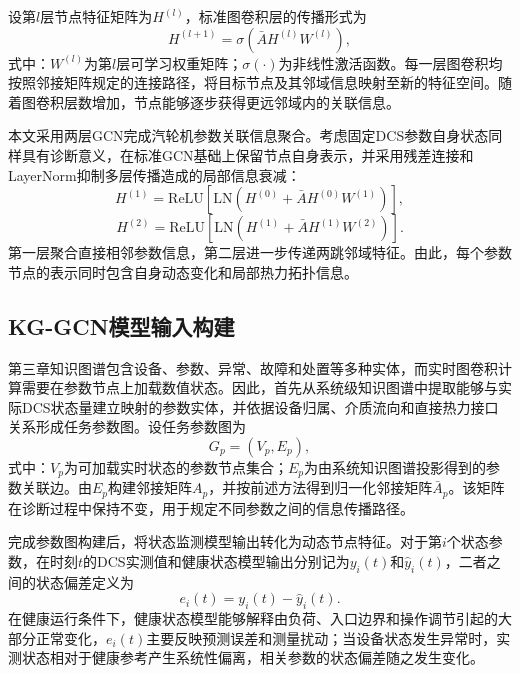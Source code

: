 设第$l$层节点特征矩阵为$H^{(l)}$，标准图卷积层的传播形式为
\begin{equation}
H^{(l+1)}=\sigma\left(\bar A H^{(l)}W^{(l)}\right),
\end{equation}
式中：$W^{(l)}$为第$l$层可学习权重矩阵；$\sigma(\cdot)$为非线性激活函数。每一层图卷积均按照邻接矩阵规定的连接路径，将目标节点及其邻域信息映射至新的特征空间。随着图卷积层数增加，节点能够逐步获得更远邻域内的关联信息。

本文采用两层GCN完成汽轮机参数关联信息聚合。考虑固定DCS参数自身状态同样具有诊断意义，在标准GCN基础上保留节点自身表示，并采用残差连接和LayerNorm抑制多层传播造成的局部信息衰减：
\begin{equation}
H^{(1)}=\mathrm{ReLU}\left[\mathrm{LN}\left(H^{(0)}+\bar A H^{(0)}W^{(1)}\right)\right],
\end{equation}
\begin{equation}
H^{(2)}=\mathrm{ReLU}\left[\mathrm{LN}\left(H^{(1)}+\bar A H^{(1)}W^{(2)}\right)\right].
\end{equation}
第一层聚合直接相邻参数信息，第二层进一步传递两跳邻域特征。由此，每个参数节点的表示同时包含自身动态变化和局部热力拓扑信息。

\subsection{KG-GCN模型输入构建}
\label{subsec:kg_input_v7}

第三章知识图谱包含设备、参数、异常、故障和处置等多种实体，而实时图卷积计算需要在参数节点上加载数值状态。因此，首先从系统级知识图谱中提取能够与实际DCS状态量建立映射的参数实体，并依据设备归属、介质流向和直接热力接口关系形成任务参数图。设任务参数图为
\begin{equation}
G_p=(V_p,E_p),
\end{equation}
式中：$V_p$为可加载实时状态的参数节点集合；$E_p$为由系统知识图谱投影得到的参数关联边。由$E_p$构建邻接矩阵$A_p$，并按前述方法得到归一化邻接矩阵$\bar A_p$。该矩阵在诊断过程中保持不变，用于规定不同参数之间的信息传播路径。

完成参数图构建后，将状态监测模型输出转化为动态节点特征。对于第$i$个状态参数，在时刻$t$的DCS实测值和健康状态模型输出分别记为$y_i(t)$和$\hat y_i(t)$，二者之间的状态偏差定义为
\begin{equation}
e_i(t)=y_i(t)-\hat y_i(t).
\end{equation}
在健康运行条件下，健康状态模型能够解释由负荷、入口边界和操作调节引起的大部分正常变化，$e_i(t)$主要反映预测误差和测量扰动；当设备状态发生异常时，实测状态相对于健康参考产生系统性偏离，相关参数的状态偏差随之发生变化。

